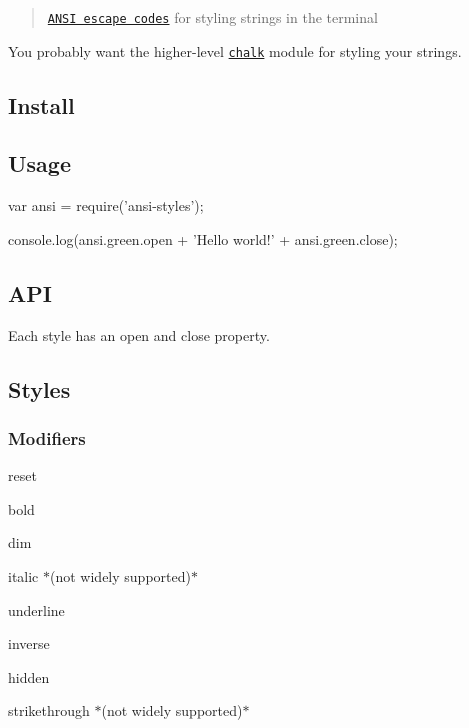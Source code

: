 \begin{quote}
\href{http://en.wikipedia.org/wiki/ANSI_escape_code#Colors_and_Styles}{\tt A\+N\+SI escape codes} for styling strings in the terminal \end{quote}


You probably want the higher-\/level \href{https://github.com/chalk/chalk}{\tt chalk} module for styling your strings.



\subsection*{Install}




\subsection*{Usage}


\begin{DoxyCode}
var ansi = require('ansi-styles');

console.log(ansi.green.open + 'Hello world!' + ansi.green.close);
\end{DoxyCode}


\subsection*{A\+PI}

Each style has an {\ttfamily open} and {\ttfamily close} property.

\subsection*{Styles}

\subsubsection*{Modifiers}


\begin{DoxyItemize}
\item {\ttfamily reset}
\item {\ttfamily bold}
\item {\ttfamily dim}
\item {\ttfamily italic} $\ast$(not widely supported)$\ast$
\item {\ttfamily underline}
\item {\ttfamily inverse}
\item {\ttfamily hidden}
\item {\ttfamily strikethrough} $\ast$(not widely supported)$\ast$
\end{DoxyItemize}

